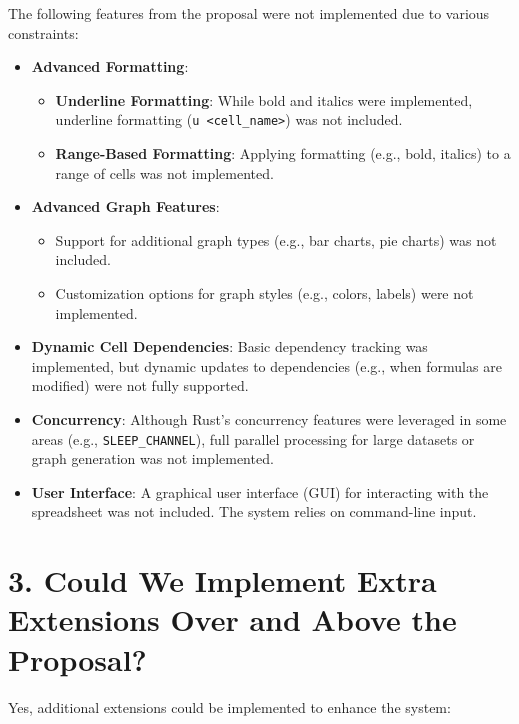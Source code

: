 \documentclass{article}
\begin{document}
The following features from the proposal were not implemented due to various constraints:

\begin{itemize}
    \item \textbf{Advanced Formatting}:
    \begin{itemize}
        \item \textbf{Underline Formatting}:
        While bold and italics were implemented, underline formatting (\texttt{u <cell\_name>}) was not included.
        \item \textbf{Range-Based Formatting}:
        Applying formatting (e.g., bold, italics) to a range of cells was not implemented.
    \end{itemize}
    \item \textbf{Advanced Graph Features}:
    \begin{itemize}
        \item Support for additional graph types (e.g., bar charts, pie charts) was not included.
        \item Customization options for graph styles (e.g., colors, labels) were not implemented.
    \end{itemize}
    \item \textbf{Dynamic Cell Dependencies}:
    Basic dependency tracking was implemented, but dynamic updates to dependencies (e.g., when formulas are modified) were not fully supported.
    \item \textbf{Concurrency}:
    Although Rust's concurrency features were leveraged in some areas (e.g., \texttt{SLEEP\_CHANNEL}), full parallel processing for large datasets or graph generation was not implemented.
    \item \textbf{User Interface}:
    A graphical user interface (GUI) for interacting with the spreadsheet was not included. The system relies on command-line input.
\end{itemize}

\section*{3. Could We Implement Extra Extensions Over and Above the Proposal?}

Yes, additional extensions could be implemented to enhance the system:
\end{document}
